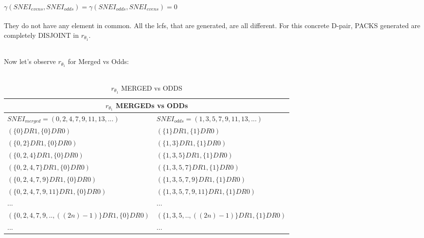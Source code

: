 	\noindent
	$\gamma(SNEI_{evens}, SNEI_{odds}) = \gamma(SNEI_{odds}, SNEI_{evens}) = 0 $
	\\\\
	
	\noindent
	They do not have any element in common. All the lcfs, that are generated, are all different. For this concrete D-pair, PACKS generated are completely DISJOINT in $r_{\theta_{1}}$.
	\\\\
	
	\newpage
	
	\noindent
	Now let's observe $r_{\theta_{1}}$ for Merged vs Odds:
	\\\\
	
	\begin{table}[h!]
		\begin{center}
			\begin{tabular}{|l||l|}
				\hline
				\multicolumn{2}{|c|}{\cellcolor{lightgray} {$r_{\theta_{1}}$ MERGEDs vs ODDs } } \\
				\hline
				$SNEI_{merged} = (0,2,4,7,9,11,13,...)$ & $ SNEI_{odds} = (1,3,5,7,9,11,13,...)$   \\
				\hline
				\hline
				$ ( \{0\}DR1, \{0\}DR0 ) $ & $ ( \{1\}DR1, \{1\}DR0 ) $ \\
				\hline
				$ ( \{0,2\}DR1, \{0\}DR0 ) $ & $ ( \{1,3\}DR1, \{1\}DR0 ) $ \\
				\hline
				$ ( \{0,2,4\}DR1, \{0\}DR0 ) $ & $ ( \{1,3,5\}DR1, \{1\}DR0 ) $ \\
				\hline
				$ ( \{0,2,4,7\}DR1, \{0\}DR0 ) $ & $ ( \{1,3,5,7\}DR1, \{1\}DR0 ) $ \\
				\hline
				$ ( \{0,2,4,7,9\}DR1, \{0\}DR0 ) $ & $ ( \{1,3,5,7,9\}DR1, \{1\}DR0 ) $ \\
				\hline
				$ ( \{0,2,4,7,9,11\}DR1, \{0\}DR0 ) $ & $ ( \{1,3,5,7,9,11\}DR1, \{1\}DR0 ) $ \\
				\hline
				... & ... \\
				\hline
				$ (\{0,2,4,7,9,.., ((2n)-1)\}DR1, \{0\}DR0 )$ & $ (\{1,3,5,.., ((2n)-1) \}DR1, \{1\}DR0 )$ \\
				\hline
				... & ... \\
				\hline
				
			\end{tabular}
			\caption{$r_{\theta_{1}}$  MERGED vs ODDS}
			\label{tab: r_theta_1_merged_vs_odds}
		\end{center}
	\end{table}
	
